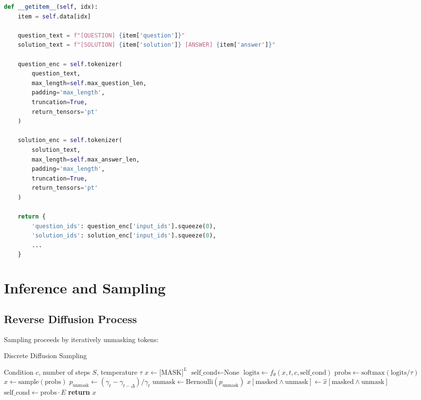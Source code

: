 \documentclass[11pt,a4paper]{article}
\begin{document}
\begin{lstlisting}[language=Python]
def __getitem__(self, idx):
    item = self.data[idx]
    
    question_text = f"[QUESTION] {item['question']}"
    solution_text = f"[SOLUTION] {item['solution']} [ANSWER] {item['answer']}"
    
    question_enc = self.tokenizer(
        question_text,
        max_length=self.max_question_len,
        padding='max_length',
        truncation=True,
        return_tensors='pt'
    )
    
    solution_enc = self.tokenizer(
        solution_text,
        max_length=self.max_answer_len,
        padding='max_length',
        truncation=True,
        return_tensors='pt'
    )
    
    return {
        'question_ids': question_enc['input_ids'].squeeze(0),
        'solution_ids': solution_enc['input_ids'].squeeze(0),
        ...
    }
\end{lstlisting}

\section{Inference and Sampling}

\subsection{Reverse Diffusion Process}

Sampling proceeds by iteratively unmasking tokens:

\begin{algorithm}[H]
\caption{Discrete Diffusion Sampling}
\begin{algorithmic}[1]
\Require Condition $c$, number of steps $S$, temperature $\tau$
\State $x \gets \text{[MASK]}^L$ 
\State $\text{self\_cond} \gets \text{None}$
    \State $\text{logits} \gets f_\theta(x, t, c, \text{self\_cond})$
    \State $\text{probs} \gets \text{softmax}(\text{logits} / \tau)$
    \State $\hat{x} \gets \text{sample}(\text{probs})$ 
    \State {}
    \State $p_{\text{unmask}} \gets (\gamma_t - \gamma_{t-\Delta}) / \gamma_t$
    \State $\text{unmask} \gets \text{Bernoulli}(p_{\text{unmask}})$
    \State $x[\text{masked} \land \text{unmask}] \gets \hat{x}[\text{masked} \land \text{unmask}]$
    \State $\text{self\_cond} \gets \text{probs} \cdot E$ 
\EndFor
\State \textbf{return} $x$
\end{algorithmic}
\end{algorithm}
\end{document}
